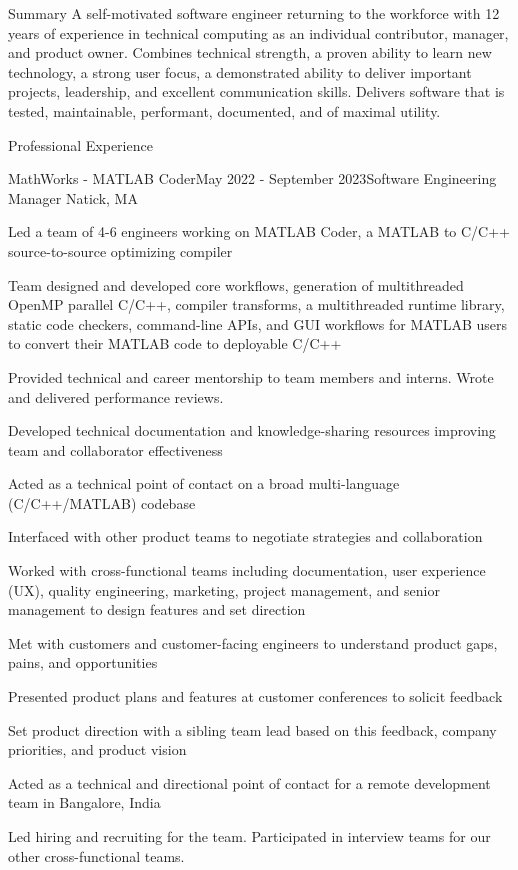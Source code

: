 \documentclass[
	usletter %
	10pt, %
]{resume} %
\begin{document}
\begin{rSection}{Summary}
	A self-motivated software engineer returning to the workforce with 12 years of experience in technical computing as an individual contributor, manager, and product owner. Combines technical strength, a proven ability to learn new technology, a strong user focus, a demonstrated ability to deliver important projects, leadership, and excellent communication skills. Delivers software that is tested, maintainable, performant, documented, and of maximal utility.
\end{rSection}

\begin{rSection}{Professional Experience}
	\begin{rSubsection}{MathWorks - MATLAB Coder}{May 2022 - September 2023}{Software Engineering Manager}
		{Natick, MA}
		\item Led a team of 4-6 engineers working on MATLAB Coder, a MATLAB to C/C++ source-to-source optimizing compiler
		\item Team designed and developed core workflows, generation of multithreaded OpenMP parallel C/C++, compiler transforms, a multithreaded runtime library, static code checkers, command-line APIs, and GUI workflows for MATLAB users to convert their MATLAB code to deployable C/C++ %
		\item Provided technical and career mentorship to team members and interns. Wrote and delivered performance reviews.
		\item Developed technical documentation and knowledge-sharing resources improving team and collaborator effectiveness
		\item Acted as a technical point of contact on a broad multi-language (C/C++/MATLAB) codebase
		\item Interfaced with other product teams to negotiate strategies and collaboration
		\item Worked with cross-functional teams including documentation, user experience (UX), quality engineering, marketing, project management, and senior management to design features and set direction
		\item Met with customers and customer-facing engineers to understand product gaps, pains, and opportunities
		\item Presented product plans and features at customer conferences to solicit feedback
		\item Set product direction with a sibling team lead based on this feedback, company priorities, and product vision
		\item Acted as a technical and directional point of contact for a remote development team in Bangalore, India
		\item Led hiring and recruiting for the team. Participated in interview teams for our other cross-functional teams.
	\end{rSubsection}


\end{rSection}
\end{document}
